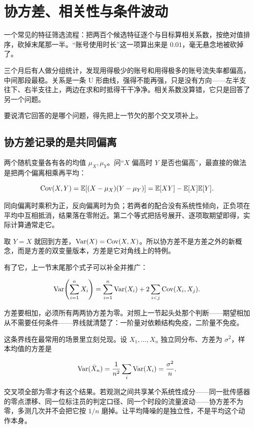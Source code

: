 \section{协方差、相关性与条件波动}
\label{sec:05-Probability/04-Expectation-and-Moments/03}

一个常见的特征筛选流程：把两百个候选特征逐个与目标算相关系数，按绝对值排序，砍掉末尾那一半。``账号使用时长''这一项算出来是 \(0.01\)，毫无悬念地被砍掉了。

三个月后有人做分组统计，发现用得极少的账号和用得极多的账号流失率都偏高，中间那段最稳。关系是一条 U 形曲线，强得不能再强，只是没有方向——左半支往下、右半支往上，两边在求和时抵得干干净净。相关系数没算错，它只是回答了另一个问题。

要说清它回答的是哪个问题，得先把上一节欠的那个交叉项补上。

\subsection{协方差记录的是共同偏离}

两个随机变量各有各的均值 \(\mu_X,\mu_Y\)。问``\(X\) 偏高时 \(Y\) 是否也偏高''，最直接的做法是把两个偏离相乘再平均：

\[
\operatorname{Cov}(X,Y)=\mathbb{E}[(X-\mu_X)(Y-\mu_Y)]=\mathbb{E}[XY]-\mathbb{E}[X]\mathbb{E}[Y].
\]

同向偏离时乘积为正，反向偏离时为负；若两者的配合没有系统性倾向，正负项在平均中互相抵消，结果落在零附近。第二个等式把括号展开、逐项取期望即得，实际计算通常走它。

取 \(Y=X\) 就回到方差，\(\operatorname{Var}(X)=\operatorname{Cov}(X,X)\)。所以协方差不是方差之外的新概念，而是方差的双变量版本，方差是它对角线上的特例。

有了它，上一节末尾那个式子可以补全并推广：

\[
\operatorname{Var}\!\left(\sum_{i=1}^n X_i\right)=\sum_{i=1}^n\operatorname{Var}(X_i)+2\sum_{i<j}\operatorname{Cov}(X_i,X_j).
\]

方差要相加，必须所有两两协方差为零。对照上一节起头处那个判断——期望相加从不需要任何条件——界线就清楚了：一阶量对依赖结构免疫，二阶量不免疫。

这条界线在最常用的场景里立刻兑现。设 \(X_1,\ldots,X_n\) 独立同分布、方差为 \(\sigma^2\)，样本均值的方差是

\[
\operatorname{Var}(\bar X_n)=\frac{1}{n^2}\sum_i\operatorname{Var}(X_i)=\frac{\sigma^2}{n},
\]

交叉项全部为零才有这个结果。若观测之间共享某个系统性成分——同一批传感器的零点漂移、同一位标注员的判定口径、同一个时段的流量波动——协方差不为零，多测几次并不会把它按 \(1/n\) 磨掉。让平均降噪的是独立性，不是平均这个动作本身。

